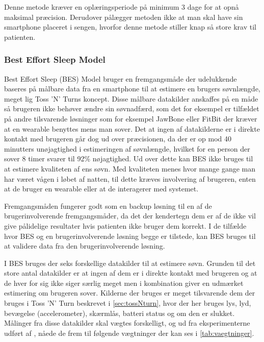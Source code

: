 Denne metode kræver en oplæringsperiode på minimum 3 dage for at opnå maksimal præcision.
Derudover pålægger metoden ikke at man skal have sin smartphone placeret i sengen, hvorfor denne metode stiller knap så store krav til patienten.

\subsubsection{Best Effort Sleep Model}\label{sec:BES}
Best Effort Sleep (BES) Model \citet{6563918} bruger en fremgangsmåde der udelukkende baseres på målbare data fra en smartphone til at estimere en brugers søvnlængde, meget lig Toss 'N' Turns koncept.
Disse målbare datakilder anskaffes på en måde så brugeren ikke behøver ændre sin søvnadfærd, som det for eksempel er tilfældet på andre tilsvarende løsninger som for eksempel JawBone eller FitBit der kræver at en wearable benyttes mens man sover.
Det at ingen af datakilderne er i direkte kontakt med brugeren går dog ud over præcisionen, da der er op mod 40 minutters unøjagtighed i estimeringen af søvnlængde, hvilket for en person der sover 8 timer svarer til 92\% nøjagtighed.
Ud over dette kan BES ikke bruges til at estimere kvaliteten af ens søvn.
Med kvaliteten menes hvor mange gange man har været vågen i løbet af natten, til dette kræves involvering af brugeren, enten at de bruger en wearable eller at de interagerer med systemet.

Fremgangsmåden fungerer godt som en backup løsning til en af de brugerinvolverende fremgangsmåder, da det der kendertegn dem er af de ikke vil give pålidelige resultater hvis patienten ikke bruger dem korrekt.
I de tilfælde hvor BES og en brugerinvolverende løsning begge er tilstede, kan BES bruges til at validere data fra den brugerinvolverende løsning. 

I BES bruges der seks forskellige datakilder til at estimere søvn.
Grunden til det store antal datakilder er at ingen af dem er i direkte kontakt med brugeren og at de hver for sig ikke siger særlig meget men i kombination giver en udmærket estimering om brugeren sover.
Kilderne der bruges er meget tilsvarende dem der bruges i Toss 'N' Turn beskrevet i \cref{sec:tossNturn}, hvor der her bruges lys, lyd, bevægelse (accelerometer), skærmlås, batteri status og om den er slukket.
Målinger fra disse datakilder skal vægtes forskelligt, og ud fra eksperimenterne udført af \citet{6563918}, nåede de frem til følgende vægtninger der kan ses i \cref{tab:vaegtninger}.

